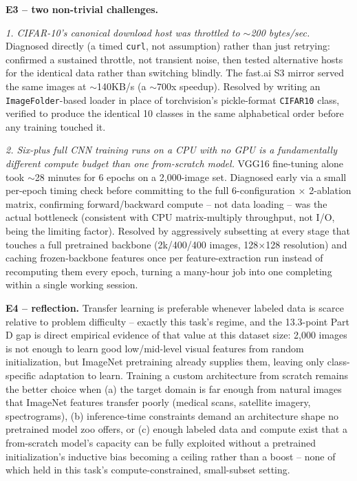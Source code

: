 \documentclass[11pt,a4paper]{article}
\begin{document}
\textbf{E3 -- two non-trivial challenges.}

\emph{1. CIFAR-10's canonical download host was throttled to $\sim$200 bytes/sec.} Diagnosed
directly (a timed \texttt{curl}, not assumption) rather than just retrying: confirmed a
sustained throttle, not transient noise, then tested alternative hosts for the identical
data rather than switching blindly. The fast.ai S3 mirror served the same images at
$\sim$140KB/s (a $\sim$700x speedup). Resolved by writing an \texttt{ImageFolder}-based
loader in place of torchvision's pickle-format \texttt{CIFAR10} class, verified to produce
the identical 10 classes in the same alphabetical order before any training touched it.

\emph{2. Six-plus full CNN training runs on a CPU with no GPU is a fundamentally different
compute budget than one from-scratch model.} VGG16 fine-tuning alone took $\sim$28 minutes
for 6 epochs on a 2{,}000-image set. Diagnosed early via a small per-epoch timing check
before committing to the full 6-configuration $\times$ 2-ablation matrix, confirming
forward/backward compute -- not data loading -- was the actual bottleneck (consistent with
CPU matrix-multiply throughput, not I/O, being the limiting factor). Resolved by
aggressively subsetting at every stage that touches a full pretrained backbone (2k/400/400
images, 128$\times$128 resolution) and caching frozen-backbone features once per
feature-extraction run instead of recomputing them every epoch, turning a many-hour job into
one completing within a single working session.

\textbf{E4 -- reflection.} Transfer learning is preferable whenever labeled data is scarce
relative to problem difficulty -- exactly this task's regime, and the 13.3-point Part D gap
is direct empirical evidence of that value at this dataset size: 2{,}000 images is not
enough to learn good low/mid-level visual features from random initialization, but ImageNet
pretraining already supplies them, leaving only class-specific adaptation to learn. Training
a custom architecture from scratch remains the better choice when (a) the target domain is
far enough from natural images that ImageNet features transfer poorly (medical scans,
satellite imagery, spectrograms), (b) inference-time constraints demand an architecture
shape no pretrained model zoo offers, or (c) enough labeled data and compute exist that a
from-scratch model's capacity can be fully exploited without a pretrained initialization's
inductive bias becoming a ceiling rather than a boost -- none of which held in this task's
compute-constrained, small-subset setting.
\end{document}
